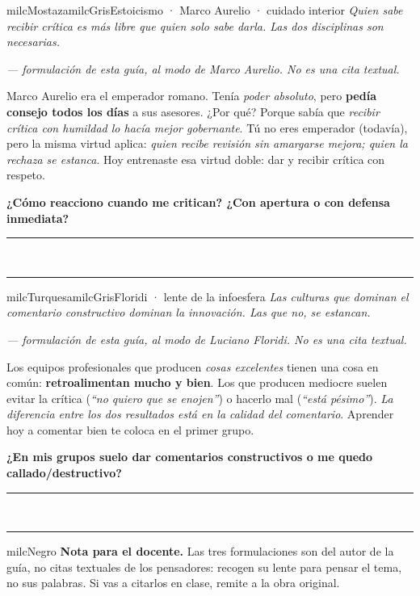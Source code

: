 \documentclass[11pt,letterpaper]{article}
\newcommand{\linead}[1]{\noindent\color{milcLinea}\rule{#1}{0.5pt}\color{milcNegro}}
\begin{document}
\begin{softbox}{milcMostaza}{milcGris}{Estoicismo · Marco Aurelio · cuidado interior}
\textit{Quien sabe recibir crítica es más libre que quien solo sabe darla. Las dos disciplinas son necesarias.}

{\footnotesize\itshape\color{milcNegro!70}--- formulación de esta guía, al modo de Marco Aurelio. No es una cita textual.}

Marco Aurelio era el emperador romano. Tenía \emph{poder absoluto}, pero \textbf{pedía consejo todos los días} a sus asesores. ¿Por qué? Porque sabía que \emph{recibir crítica con humildad lo hacía mejor gobernante}. Tú no eres emperador (todavía), pero la misma virtud aplica: \emph{quien recibe revisión sin amargarse mejora; quien la rechaza se estanca}. Hoy entrenaste esa virtud doble: dar y recibir crítica con respeto.

\textbf{¿Cómo reacciono cuando me critican? ¿Con apertura o con defensa inmediata?}
\end{softbox}
\linead{\linewidth}\\[1mm]
\linead{\linewidth}

\begin{softbox}{milcTurquesa}{milcGris}{Floridi · lente de la infoesfera}
\textit{Las culturas que dominan el comentario constructivo dominan la innovación. Las que no, se estancan.}

{\footnotesize\itshape\color{milcNegro!70}--- formulación de esta guía, al modo de Luciano Floridi. No es una cita textual.}

Los equipos profesionales que producen \emph{cosas excelentes} tienen una cosa en común: \textbf{retroalimentan mucho y bien}. Los que producen mediocre suelen evitar la crítica (\emph{``no quiero que se enojen''}) o hacerlo mal (\emph{``está pésimo''}). \emph{La diferencia entre los dos resultados está en la calidad del comentario}. Aprender hoy a comentar bien te coloca en el primer grupo.

\textbf{¿En mis grupos suelo dar comentarios constructivos o me quedo callado/destructivo?}
\end{softbox}
\linead{\linewidth}\\[1mm]
\linead{\linewidth}

\begin{infoband}{milcNegro}
\textbf{Nota para el docente.} Las tres formulaciones son del autor de la guía, no citas textuales de los pensadores: recogen su lente para pensar el tema, no sus palabras. Si vas a citarlos en clase, remite a la obra original.
\end{infoband}
\end{document}
